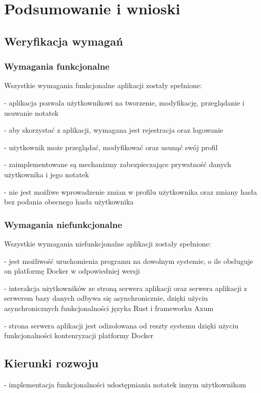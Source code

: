 \documentclass[a4paper,twoside,12pt]{book}
\begin{document}
\chapter{Podsumowanie i wnioski}
\section{Weryfikacja wymagań}
\subsection{Wymagania funkcjonalne}

Wszystkie wymagania funkcjonalne aplikacji zostały spełnione:

- aplikacja pozwala użytkownikowi na tworzenie, modyfikację, przeglądanie i usuwanie notatek

- aby skorzystać z aplikacji, wymagana jest rejestracja oraz logowanie

- użytkownik może przeglądać, modyfikować oraz usunąć swój profil

- zaimplementowane są mechanizmy zabezpieczające prywatność danych użytkownika i jego notatek

- nie jest możliwe wprowadzenie zmian w profilu użytkownika oraz zmiany hasła bez podania
obecnego hasła użytkownika

\subsection{Wymagania niefunkcjonalne}

Wszystkie wymagania niefunkcjonalne aplikacji zostały spełnione:

- jest możliwość uruchomienia programu na dowolnym systemie, o ile obsługuje on platformę Docker w odpowiedniej wersji

- interakcja użytkowników ze stroną serwera aplikacji oraz serwera aplikacji z serwerem bazy 
danych odbywa się asynchronicznie, dzięki użyciu asynchronicznych funkcjonalności języka Rust i frameworku Axum

- strona serwera aplikacji jest odizolowana od reszty systemu dzięki użyciu funkcjonalności
kontenryzacji platformy Docker


\section{Kierunki rozwoju}

- implementacja funkcjonalności udostępniania notatek innym użytkownikom
\end{document}
